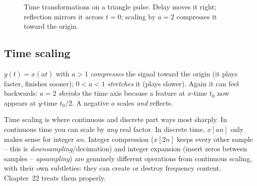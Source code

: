 \begin{figure}[h]
\centering
{}
\caption{Time transformations on a triangle pulse. Delay moves it right; reflection mirrors it across $t=0$; scaling by $a=2$ compresses it toward the origin.}
\label{ch02:fig-transforms}
\end{figure}

\subsection{Time scaling}

$y(t) = x(at)$ with $a > 1$ \emph{compresses} the signal toward the origin (it plays
faster, finishes sooner); $0 < a < 1$ \emph{stretches} it (plays slower). Again it
can feel backwards: $a=2$ \emph{shrinks} the time axis because a feature at
$x$-time $t_0$ now appears at $y$-time $t_0/2$. A negative $a$ scales \emph{and}
reflects.

Time scaling is where continuous and discrete part ways most sharply. In continuous
time you can scale by \emph{any} real factor. In discrete time, $x[an]$ only makes
sense for integer $an$. Integer compression ($x[2n]$ keeps every other sample --
this is \emph{downsampling}/decimation) and integer expansion (insert zeros between
samples -- \emph{upsampling}) are genuinely different operations from continuous
scaling, with their own subtleties: they can create or destroy frequency content.
Chapter~22 treats them properly.

